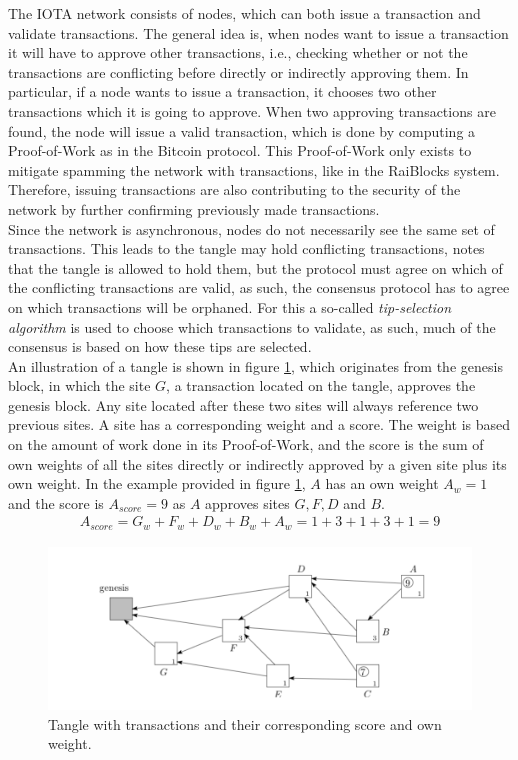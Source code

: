 The IOTA network consists of nodes, which can both issue a transaction and validate transactions. The general idea is, when nodes want to issue a transaction it will have to approve other transactions, i.e., checking whether or not the transactions are conflicting before directly or indirectly approving them. In particular, if a node wants to issue a transaction, it chooses two other transactions which it is going to approve. When two approving transactions are found, the node will issue a valid transaction, which is done by computing a Proof-of-Work as in the Bitcoin protocol. This Proof-of-Work only exists to mitigate spamming the network with transactions, like in the RaiBlocks system. Therefore, issuing transactions are also contributing to the security of the network by further confirming previously made transactions.\\

Since the network is asynchronous, nodes do not necessarily see the same set of transactions. This leads to the tangle may hold conflicting transactions, \cite{tangle} notes that the tangle is allowed to hold them, but the protocol must agree on which of the conflicting transactions are valid, as such, the consensus protocol has to agree on which transactions will be orphaned. For this a so-called \emph{tip-selection algorithm} is used to choose which transactions to validate, as such, much of the consensus is based on how these tips are selected.\\


An illustration of a tangle is shown in figure \ref{fig:iota-tangle}, which originates from the genesis block, in which the site $G$, a transaction located on the tangle, approves the genesis block. Any site located after these two sites will always reference two previous sites. A site has a corresponding weight and a score. The weight is based on the amount of work done in its Proof-of-Work, and the score is the sum of own weights of all the sites directly or indirectly approved by a given site plus its own weight. In the example provided in figure \ref{fig:iota-tangle}, $A$ has an own weight $A_w = 1$ and the score is $A_{score}=9$ as $A$ approves sites $G,F,D$ and $B$.
\begin{align*}
    A_{score} = G_{w} + F_{w} + D_{w} + B_{w} + A_{w} = 1 + 3 + 1 + 3 + 1 = 9
\end{align*}

\begin{figure}[H]
    \centering
    \includegraphics[width=\linewidth]{images/iota-score.png}
    \caption{Tangle with transactions and their corresponding score and own weight.}
    \label{fig:iota-tangle}
\end{figure}

